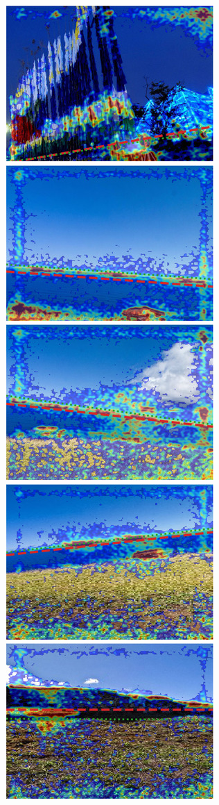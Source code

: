 \includegraphics{sgbp/thumb/pano_ayflzrhzcccird-6.jpg}
\includegraphics{sgbp/thumb/pano_ayfnoupsclgjpp-3.jpg}
\includegraphics{sgbp/thumb/pano_ayfnoupsclgjpp-4.jpg}
\includegraphics{sgbp/thumb/pano_ayfnoupsclgjpp-5.jpg}
\includegraphics{sgbp/thumb/pano_ayfnoupsclgjpp-6.jpg}

